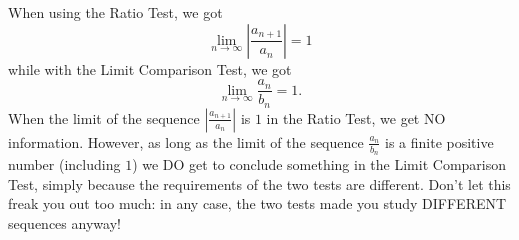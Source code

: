 \documentclass{article}
\begin{document}
{\color{blue} When using the Ratio Test, we got \[\displaystyle \lim_{n \to \infty} \left|\frac{a_{n+1}}{a_n}\right|=1\] while with the Limit Comparison Test, we got \[\lim_{n \to \infty} \frac{a_n}{b_n} = 1.\]
When the limit of the sequence $\left|\frac{a_{n+1}}{a_n}\right|$ is $1$ in the Ratio Test, we get NO information. However, as long as the limit of the sequence $\frac{a_n}{b_n}$ is a finite positive number (including $1$) we DO get to conclude something in the Limit Comparison Test, simply because the requirements of the two tests are different. Don't let this freak you out too much: in any case, the two tests made you study DIFFERENT sequences anyway!
}
\end{document}
